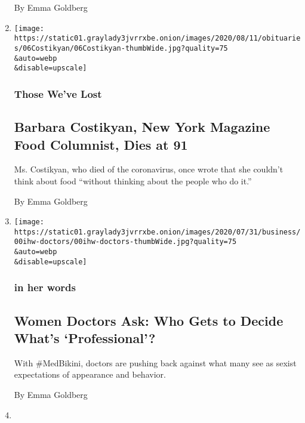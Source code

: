 \begin{enumerate}
  By Emma Goldberg
\item
  \href{/2020/08/07/obituaries/barbara-costikyan-dead-coronavirus.html}{}

  \texttt{[image: https://static01.graylady3jvrrxbe.onion/images/2020/08/11/obituaries/06Costikyan/06Costikyan-thumbWide.jpg?quality=75\\\&auto=webp\\\&disable=upscale]}

  \hypertarget{those-weve-lost}{%
  \subsubsection{Those We've Lost}\label{those-weve-lost}}

  \hypertarget{barbara-costikyan-new-york-magazine-food-columnist-dies-at-91}{%
  \subsection{Barbara Costikyan, New York Magazine Food Columnist, Dies
  at
  91}\label{barbara-costikyan-new-york-magazine-food-columnist-dies-at-91}}

  Ms. Costikyan, who died of the coronavirus, once wrote that she
  couldn't think about food ``without thinking about the people who do
  it.''

  By Emma Goldberg
\item
  \href{/2020/08/02/us/women-doctors-medbikini-professional-gender-bias.html}{}

  \texttt{[image: https://static01.graylady3jvrrxbe.onion/images/2020/07/31/business/00ihw-doctors/00ihw-doctors-thumbWide.jpg?quality=75\\\&auto=webp\\\&disable=upscale]}

  \hypertarget{in-her-words-1}{%
  \subsubsection{in her words}\label{in-her-words-1}}

  \hypertarget{women-doctors-ask-who-gets-to-decide-whats-professional}{%
  \subsection{Women Doctors Ask: Who Gets to Decide What's
  `Professional'?}\label{women-doctors-ask-who-gets-to-decide-whats-professional}}

  With \#MedBikini, doctors are pushing back against what many see as
  sexist expectations of appearance and behavior.

  By Emma Goldberg
\item
  \href{/2020/07/24/us/climate-change-green-new-deal-covid-coronavirus.html}{}


\end{enumerate}
